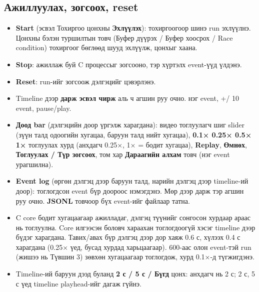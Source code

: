 \documentclass[12pt,a4paper]{article}
\newcommand{\key}[1]{\fbox{\footnotesize\ttfamily #1}}
\begin{document}

\subsection{Ажиллуулах, зогсоох, reset}
\begin{itemize}
  \item \textbf{Start} (эсвэл Тохиргоо цонхны \textbf{Эхлүүлэх}): тохиргоогоор шинэ run эхлүүлнэ. Цонхны бэлэн туршилтын товч (Буфер дүүрэх / Буфер хоосрох / Race condition) тохиргоог бөглөөд шууд эхлүүлж, цонхыг хаана.
  \item \textbf{Stop}: ажиллаж буй C процессыг зогсооно, тэр хүртэлх event-үүд үлдэнэ.
  \item \textbf{Reset}: run-ийг зогсоож дэлгэцийг цэвэрлэнэ.
  \item Timeline дээр \textbf{дарж эсвэл чирж} аль ч агшин руу очно. \key{←} \key{→} нэг event, \key{Shift}+\key{←}/\key{→} 10 event, \key{Space} pause/play.
  \item \textbf{Доод bar} (дэлгэцийн доор үргэлж харагдана): видео тоглуулагч шиг slider (зүүн талд одоогийн хугацаа, баруун талд нийт хугацаа), \textbf{0.1× 0.25× 0.5× 1×} тоглуулах хурд (анхдагч 0.25×, 1× = бодит хугацаа), \textbf{Replay}, \textbf{Өмнөх}, \textbf{Тоглуулах / Түр зогсоох}, том хар \textbf{Дараагийн алхам} товч (нэг event урагшилна).
  \item \textbf{Event log} (өргөн дэлгэц дээр баруун талд, нарийн дэлгэц дээр timeline-ий доор): тоглогдсон event бүр доороос нэмэгдэнэ. Мөр дээр дарж тэр агшин руу очно. \textbf{JSONL} товчоор бүх event-ийг файлаар татна.
  \item C core бодит хугацаагаар ажилладаг, дэлгэц түүнийг сонгосон хурдаар араас нь тоглуулна. Core илгээсэн боловч хараахан тоглогдоогүй хэсэг timeline дээр бүдэг харагдана. Тавих/авах бүр дэлгэц дээр дор хаяж 0.6 с, хүлээх 0.4 с харагдана (0.25× үед, бусад хурдад харьцаагаар). 600-аас олон event-тэй run (жишээ нь Түвшин 3) зөвхөн хугацаагаар тоглогдож, хурд 0.1×-д түгжигдэнэ.
  \item Timeline-ий баруун дээд буланд \textbf{2 с / 5 с / Бүгд} цонх: анхдагч нь 2 с; 2 с, 5 с үед timeline playhead-ийг дагаж гүйнэ.
\end{itemize}
\end{document}
